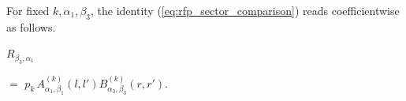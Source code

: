 For fixed $k,\alpha_1,\beta_3$, the identity
(\ref{eq:rfp_sector_comparison}) reads coefficientwise as follows.
\begin{tenkzequation}
    \tenkzkernel
    $R_{\beta_3,\alpha_1}\,$
    \begin{tenkz}[cols=1]
    \end{tenkz}
    $ = $
    $p_k\,A^{(k)}_{\alpha_1,\beta_1}(l,l')
        B^{(k)}_{\alpha_3,\beta_3}(r,r')$.
\end{tenkzequation}

